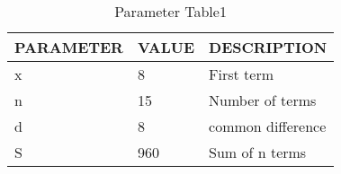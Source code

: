 \begin{table}[htbp]
    \def\arraystretch{1.5}
    \centering
    \begin{tabular}{|p{2.3cm}|p{2.3cm}|p{2.3cm}|}
    \hline
    PARAMETER & VALUE & DESCRIPTION \\ \hline
    x\brak0 & 8 & First term \\ \hline
    n & 15 & Number of terms \\ \hline
    d & 8 & common difference \\ \hline
    S &960 & Sum of n terms \\ \hline
    \end{tabular}
    \caption{Parameter Table1}
    \label{tab:1}
\end{table}
